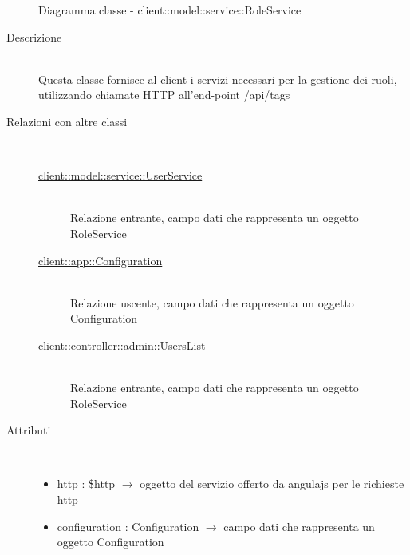 \vspace{0.5cm}
\hypertarget{client::model::service::RoleService}{}
\begin{figure}[H]
	\centering
	\caption{Diagramma classe - client::model::service::RoleService}
\end{figure}\begin{description}
\item[Descrizione] \hfill \\
Questa classe fornisce al client i servizi necessari per la gestione dei ruoli, utilizzando chiamate HTTP all'end-point /api/tags
\item[Relazioni con altre classi] \hfill \\
\vspace{-7mm}
\begin{description}
	\item[\hyperlink{client::model::service::UserService}{client::model::service::UserService}] \hfill \\
	Relazione entrante, campo dati che rappresenta un oggetto RoleService
	\item[\hyperlink{client::app::Configuration}{client::app::Configuration}] \hfill \\
	Relazione uscente, campo dati che rappresenta un oggetto Configuration
	\item[\hyperlink{client::controller::admin::UsersList}{client::controller::admin::UsersList}] \hfill \\
	Relazione entrante, campo dati che rappresenta un oggetto RoleService
\end{description}

\item[Attributi] \hfill \\
\vspace{-7mm}
\begin{itemize}
	\item http : \$http $\rightarrow$ oggetto del servizio offerto da angulajs per le richieste http
	\item configuration : Configuration $\rightarrow$ campo dati che rappresenta un oggetto Configuration
\end{itemize}


\end{description}
